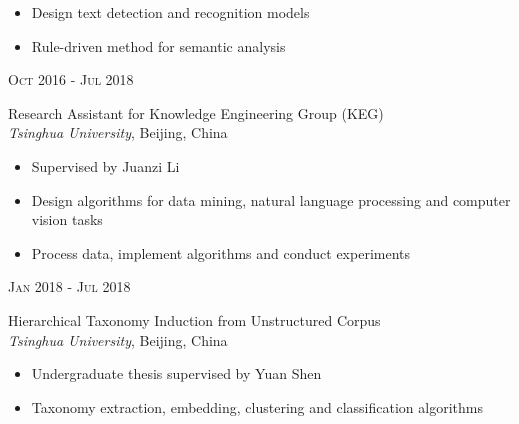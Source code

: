 \documentclass[10pt]{article} %
\begin{document}
{\begin{minipage}[t]{0.5\textwidth}
\normalsize{\begin{itemize}
		\item Design text detection and recognition models
		\item Rule-driven method for semantic analysis
\end{itemize}}

{\raggedleft\textsc{Oct 2016 - Jul 2018}\par}

{\raggedright\large Research Assistant for Knowledge Engineering Group (KEG)\\
\textit{Tsinghua University}, Beijing, China\\[5pt]}

\normalsize{\begin{itemize}
		\item Supervised by Juanzi Li
		\item Design algorithms for data mining, natural language processing and computer vision tasks
		\item Process data, implement algorithms and conduct experiments
\end{itemize}}

{\raggedleft\textsc{Jan 2018 - Jul 2018}\par}

{\raggedright\large Hierarchical Taxonomy Induction from Unstructured Corpus\\
	\textit{Tsinghua University}, Beijing, China\\[5pt]}

\normalsize{\begin{itemize}
		\item Undergraduate thesis supervised by Yuan Shen
		\item Taxonomy extraction, embedding, clustering and classification algorithms
\end{itemize}}




\end{minipage} %
\hfill
\begin{minipage}[t]{0.44\textwidth} %
\vspace{0pt} %



\end{minipage}}
\end{document}
